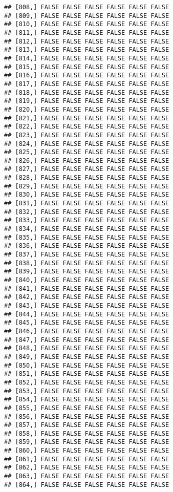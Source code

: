 \documentclass[
]{article}
\begin{document}
\begin{verbatim}
## [808,] FALSE FALSE FALSE FALSE FALSE FALSE
## [809,] FALSE FALSE FALSE FALSE FALSE FALSE
## [810,] FALSE FALSE FALSE FALSE FALSE FALSE
## [811,] FALSE FALSE FALSE FALSE FALSE FALSE
## [812,] FALSE FALSE FALSE FALSE FALSE FALSE
## [813,] FALSE FALSE FALSE FALSE FALSE FALSE
## [814,] FALSE FALSE FALSE FALSE FALSE FALSE
## [815,] FALSE FALSE FALSE FALSE FALSE FALSE
## [816,] FALSE FALSE FALSE FALSE FALSE FALSE
## [817,] FALSE FALSE FALSE FALSE FALSE FALSE
## [818,] FALSE FALSE FALSE FALSE FALSE FALSE
## [819,] FALSE FALSE FALSE FALSE FALSE FALSE
## [820,] FALSE FALSE FALSE FALSE FALSE FALSE
## [821,] FALSE FALSE FALSE FALSE FALSE FALSE
## [822,] FALSE FALSE FALSE FALSE FALSE FALSE
## [823,] FALSE FALSE FALSE FALSE FALSE FALSE
## [824,] FALSE FALSE FALSE FALSE FALSE FALSE
## [825,] FALSE FALSE FALSE FALSE FALSE FALSE
## [826,] FALSE FALSE FALSE FALSE FALSE FALSE
## [827,] FALSE FALSE FALSE FALSE FALSE FALSE
## [828,] FALSE FALSE FALSE FALSE FALSE FALSE
## [829,] FALSE FALSE FALSE FALSE FALSE FALSE
## [830,] FALSE FALSE FALSE FALSE FALSE FALSE
## [831,] FALSE FALSE FALSE FALSE FALSE FALSE
## [832,] FALSE FALSE FALSE FALSE FALSE FALSE
## [833,] FALSE FALSE FALSE FALSE FALSE FALSE
## [834,] FALSE FALSE FALSE FALSE FALSE FALSE
## [835,] FALSE FALSE FALSE FALSE FALSE FALSE
## [836,] FALSE FALSE FALSE FALSE FALSE FALSE
## [837,] FALSE FALSE FALSE FALSE FALSE FALSE
## [838,] FALSE FALSE FALSE FALSE FALSE FALSE
## [839,] FALSE FALSE FALSE FALSE FALSE FALSE
## [840,] FALSE FALSE FALSE FALSE FALSE FALSE
## [841,] FALSE FALSE FALSE FALSE FALSE FALSE
## [842,] FALSE FALSE FALSE FALSE FALSE FALSE
## [843,] FALSE FALSE FALSE FALSE FALSE FALSE
## [844,] FALSE FALSE FALSE FALSE FALSE FALSE
## [845,] FALSE FALSE FALSE FALSE FALSE FALSE
## [846,] FALSE FALSE FALSE FALSE FALSE FALSE
## [847,] FALSE FALSE FALSE FALSE FALSE FALSE
## [848,] FALSE FALSE FALSE FALSE FALSE FALSE
## [849,] FALSE FALSE FALSE FALSE FALSE FALSE
## [850,] FALSE FALSE FALSE FALSE FALSE FALSE
## [851,] FALSE FALSE FALSE FALSE FALSE FALSE
## [852,] FALSE FALSE FALSE FALSE FALSE FALSE
## [853,] FALSE FALSE FALSE FALSE FALSE FALSE
## [854,] FALSE FALSE FALSE FALSE FALSE FALSE
## [855,] FALSE FALSE FALSE FALSE FALSE FALSE
## [856,] FALSE FALSE FALSE FALSE FALSE FALSE
## [857,] FALSE FALSE FALSE FALSE FALSE FALSE
## [858,] FALSE FALSE FALSE FALSE FALSE FALSE
## [859,] FALSE FALSE FALSE FALSE FALSE FALSE
## [860,] FALSE FALSE FALSE FALSE FALSE FALSE
## [861,] FALSE FALSE FALSE FALSE FALSE FALSE
## [862,] FALSE FALSE FALSE FALSE FALSE FALSE
## [863,] FALSE FALSE FALSE FALSE FALSE FALSE
## [864,] FALSE FALSE FALSE FALSE FALSE FALSE

\end{verbatim}
\end{document}
